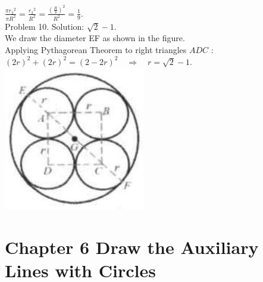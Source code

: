 \documentclass[10pt]{article}
\begin{document}
\(\frac{\pi r_{2}{ }^{2}}{\pi R^{2}}=\frac{r_{2}{ }^{2}}{R^{2}}=\frac{\left(\frac{R}{3}\right)^{2}}{R^{2}}=\frac{1}{9}\).\\
Problem 10. Solution: \(\sqrt{2}-1\).\\
We draw the diameter EF as shown in the figure.\\
Applying Pythagorean Theorem to right triangles \(A D C\) :\\
\((2 r)^{2}+(2 r)^{2}=(2-2 r)^{2} \quad \Rightarrow \quad r=\sqrt{2}-1\).\\
\includegraphics[max width=\textwidth, center]{2025_04_17_97bc1f7e44d93c271a88g-190}

\section*{Chapter 6 Draw the Auxiliary Lines with Circles}
\end{document}
